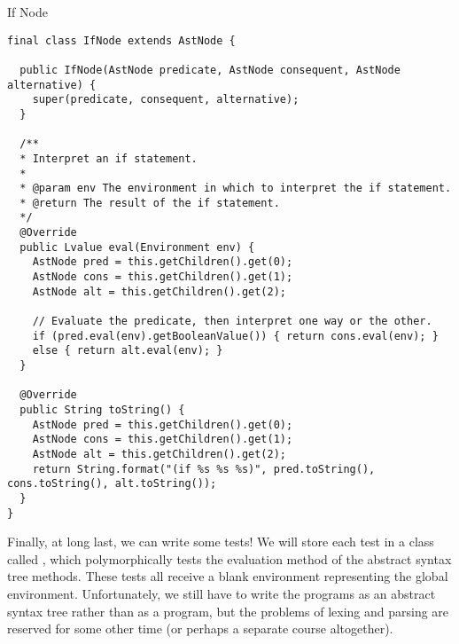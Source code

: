 \begin{cl}{If Node}
\begin{lstlisting}[language=MyJava]
final class IfNode extends AstNode {
  
  public IfNode(AstNode predicate, AstNode consequent, AstNode alternative) {
    super(predicate, consequent, alternative);
  }

  /**
  * Interpret an if statement.
  *
  * @param env The environment in which to interpret the if statement.
  * @return The result of the if statement.
  */
  @Override
  public Lvalue eval(Environment env) {
    AstNode pred = this.getChildren().get(0);
    AstNode cons = this.getChildren().get(1);
    AstNode alt = this.getChildren().get(2);

    // Evaluate the predicate, then interpret one way or the other.
    if (pred.eval(env).getBooleanValue()) { return cons.eval(env); } 
    else { return alt.eval(env); }
  }
  
  @Override
  public String toString() {
    AstNode pred = this.getChildren().get(0);
    AstNode cons = this.getChildren().get(1);
    AstNode alt = this.getChildren().get(2);
    return String.format("(if %s %s %s)", pred.toString(), cons.toString(), alt.toString());
  }
}
\end{lstlisting}
\end{cl}

Finally, at long last, we can write some tests! We will store each test in a class called , which polymorphically tests the evaluation method of the abstract syntax tree methods. These tests all receive a blank environment representing the global environment. Unfortunately, we still have to write the programs as an abstract syntax tree rather than as a program, but the problems of lexing and parsing are reserved for some other time (or perhaps a separate course altogether).

